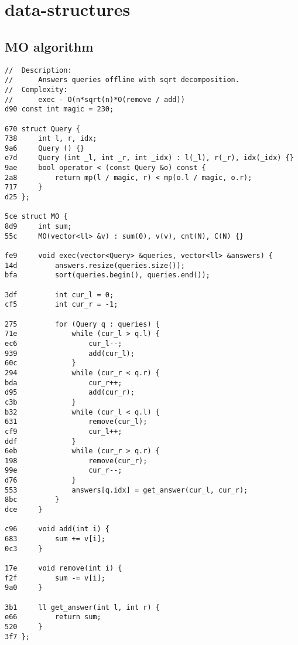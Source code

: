 \documentclass[11pt, a4paper, twoside]{article}
\begin{document}
\section{data-structures}

\subsection{ MO algorithm}
\begin{lstlisting}
//  Description: 
//      Answers queries offline with sqrt decomposition.
//  Complexity: 
//      exec - O(n*sqrt(n)*O(remove / add))
d90 const int magic = 230;

670 struct Query {
738     int l, r, idx;
9a6     Query () {}
e7d     Query (int _l, int _r, int _idx) : l(_l), r(_r), idx(_idx) {}
9ae     bool operator < (const Query &o) const {
2a8         return mp(l / magic, r) < mp(o.l / magic, o.r);
717     }
d25 };

5ce struct MO {
8d9     int sum;
55c     MO(vector<ll> &v) : sum(0), v(v), cnt(N), C(N) {}
    
fe9     void exec(vector<Query> &queries, vector<ll> &answers) {
14d         answers.resize(queries.size());
bfa         sort(queries.begin(), queries.end());
    
3df         int cur_l = 0;
cf5         int cur_r = -1;
    
275         for (Query q : queries) {
71e             while (cur_l > q.l) {
ec6                 cur_l--;
939                 add(cur_l);
60c             }
294             while (cur_r < q.r) {
bda                 cur_r++;
d95                 add(cur_r);
c3b             }
b32             while (cur_l < q.l) {
631                 remove(cur_l);
cf9                 cur_l++;
ddf             }
6eb             while (cur_r > q.r) {
198                 remove(cur_r);
99e                 cur_r--;
d76             }
553             answers[q.idx] = get_answer(cur_l, cur_r);
8bc         }
dce     }
    
c96     void add(int i) {
683         sum += v[i];
0c3     }
    
17e     void remove(int i) {
f2f         sum -= v[i];
9a0     }
    
3b1     ll get_answer(int l, int r) {
e66         return sum;
520     }
3f7 };
\end{lstlisting}
\end{document}
